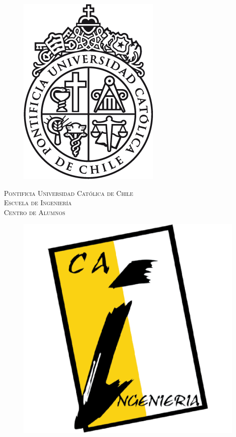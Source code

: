\documentclass[oneside, letterpaper]{memoir}
\begin{document}
    \begin{center}

        \begin{figure}
            \vspace{-2em}
            \centering
            \includegraphics[scale=1.2]{../img/puc.png}\\
        \end{figure}


        {\huge
            \textsc{Pontificia Universidad Católica de Chile}\\
        }{\huge
            \textsc{Escuela de Ingeniería}\\
        }{\Huge
            \textsc{Centro de Alumnos}\\
        }

        \vspace{2em}

        \begin{figure}[h]
            \centering
            \includegraphics[scale=1]{../img/cai.png}
        \end{figure}


\end{center}
\end{document}
